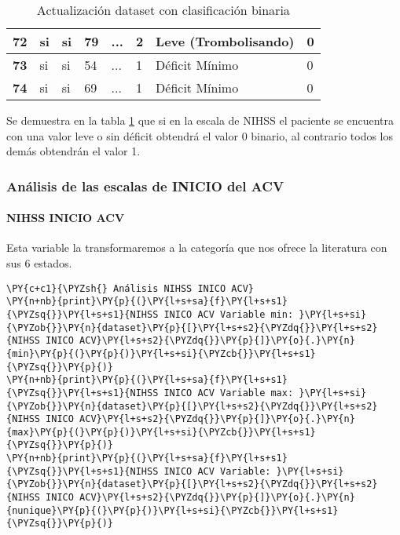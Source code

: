 \begin{table}[H]
{\begin{tabular}{|c|l|l|l|l|l|l|l|}
\textbf{72} & si & si & 79 & ... & 2 & Leve (Trombolisando) & 0 \\ \hline
\textbf{73} & si & si & 54 & ... & 1 & Déficit Mínimo & 0 \\ \hline
\textbf{74} & si & si & 69 & ... & 1 & Déficit Mínimo & 0 \\ \hline
\end{tabular}%
}
\caption{Actualización dataset con clasificación binaria}
\label{tab:Nihss estable o grave tabla}
\end{table}

	Se demuestra en la tabla \ref{tab:Nihss estable o grave tabla} que si en la escala de NIHSS el paciente se encuentra con una valor leve o sin déficit obtendrá el valor 0 binario, al contrario todos los demás obtendrán el valor 1.
        
    \hypertarget{anuxe1lisis-de-las-las-escalas-de-inicio-del-acv}{%
\subsubsection{Análisis de las escalas de INICIO del
ACV}\label{anuxe1lisis-de-las-las-escalas-de-inicio-del-acv}}

    \hypertarget{nihss-inico-acv}{%
\paragraph{NIHSS INICIO ACV}\label{nihss-inico-acv}}

Esta variable la transformaremos a la categoría que nos ofrece la literatura con sus 6 estados.

    \begin{tcolorbox}[breakable, size=fbox, boxrule=1pt, pad at break*=1mm,colback=cellbackground, colframe=cellborder]
\begin{Verbatim}[commandchars=\\\{\}]
\PY{c+c1}{\PYZsh{} Análisis NIHSS INICO ACV}
\PY{n+nb}{print}\PY{p}{(}\PY{l+s+sa}{f}\PY{l+s+s1}{\PYZsq{}}\PY{l+s+s1}{NIHSS INICO ACV Variable min: }\PY{l+s+si}{\PYZob{}}\PY{n}{dataset}\PY{p}{[}\PY{l+s+s2}{\PYZdq{}}\PY{l+s+s2}{NIHSS INICO ACV}\PY{l+s+s2}{\PYZdq{}}\PY{p}{]}\PY{o}{.}\PY{n}{min}\PY{p}{(}\PY{p}{)}\PY{l+s+si}{\PYZcb{}}\PY{l+s+s1}{\PYZsq{}}\PY{p}{)}
\PY{n+nb}{print}\PY{p}{(}\PY{l+s+sa}{f}\PY{l+s+s1}{\PYZsq{}}\PY{l+s+s1}{NIHSS INICO ACV Variable max: }\PY{l+s+si}{\PYZob{}}\PY{n}{dataset}\PY{p}{[}\PY{l+s+s2}{\PYZdq{}}\PY{l+s+s2}{NIHSS INICO ACV}\PY{l+s+s2}{\PYZdq{}}\PY{p}{]}\PY{o}{.}\PY{n}{max}\PY{p}{(}\PY{p}{)}\PY{l+s+si}{\PYZcb{}}\PY{l+s+s1}{\PYZsq{}}\PY{p}{)}
\PY{n+nb}{print}\PY{p}{(}\PY{l+s+sa}{f}\PY{l+s+s1}{\PYZsq{}}\PY{l+s+s1}{NIHSS INICO ACV Variable: }\PY{l+s+si}{\PYZob{}}\PY{n}{dataset}\PY{p}{[}\PY{l+s+s2}{\PYZdq{}}\PY{l+s+s2}{NIHSS INICO ACV}\PY{l+s+s2}{\PYZdq{}}\PY{p}{]}\PY{o}{.}\PY{n}{nunique}\PY{p}{(}\PY{p}{)}\PY{l+s+si}{\PYZcb{}}\PY{l+s+s1}{\PYZsq{}}\PY{p}{)}
\end{Verbatim}
\end{tcolorbox}

